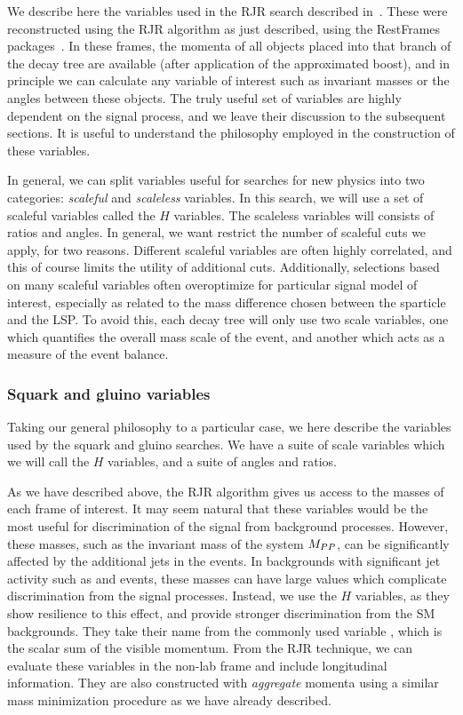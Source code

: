We describe here the variables used in the RJR search described in~\cite{ATLAS-CONF-2016-078}.
These were reconstructed using the RJR algorithm as just described, using the RestFrames packages~\cite{RestFrames}.
In these frames, the momenta of all objects placed into that branch of the decay tree are available (after application of the approximated boost), and in principle we can calculate any variable of interest such as invariant masses or the angles between these objects.
The truly useful set of variables are highly dependent on the signal process, and we leave their discussion to the subsequent sections.
It is useful to understand the philosophy employed in the construction of these variables.

In general, we can split variables useful for searches for new physics into two categories: \textit{scaleful} and \textit{scaleless} variables.
In this search, we will use a set of scaleful variables called the $H$ variables.
The scaleless variables will consists of ratios and angles.
In general, we want restrict the number of scaleful cuts we apply, for two reasons.
Different scaleful variables are often highly correlated, and this of course limits the utility of additional cuts.
Additionally, selections based on many scaleful variables often overoptimize for particular signal model of interest, especially as related to the mass difference chosen between the sparticle and the LSP.
To avoid this, each decay tree will only use two scale variables, one which quantifies the overall mass scale of the event, and another which acts as a measure of the event balance.

\subsubsection{Squark and gluino variables}

Taking our general philosophy to a particular case, we here describe the variables used by the squark and gluino searches.
We have a suite of scale variables which we will call the $H$ variables, and a suite of angles and ratios.

As we have described above, the RJR algorithm gives us access to the masses of each frame of interest.
It may seem natural that these variables would be the most useful for discrimination of the signal from background processes.
However, these masses, such as the invariant mass of the \PP system $M_{PP }$, can be significantly affected by the additional jets in the events.
In backgrounds with significant jet activity such as \zjets and \wjets events, these masses can have large values which complicate discrimination from the signal processes.
Instead, we use the $H$ variables, as they show resilience to this effect, and provide stronger discrimination from the SM backgrounds.
They take their name from the commonly used variable \HT, which is the scalar sum of the visible momentum.
From the RJR technique, we can evaluate these variables in the non-lab frame and include longitudinal information.
They are also constructed with \textit{aggregate} momenta using a similar mass minimization procedure as we have already described.

